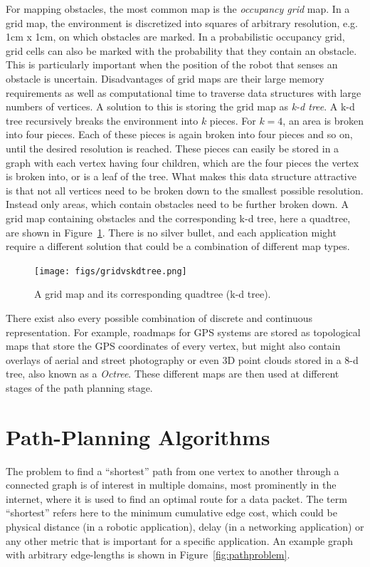 For mapping obstacles, the most common map is the \emph{occupancy grid} map. In a grid map, the environment is discretized into squares of arbitrary resolution, e.g. 1cm x 1cm, on which obstacles are marked. In a probabilistic occupancy grid, grid cells can also be marked with the probability that they contain an obstacle. This is particularly important when the position of the robot that senses an obstacle is uncertain. Disadvantages of grid maps are their large memory requirements as well as computational time to traverse data structures with large numbers of vertices. A solution to this is storing the grid map as \emph{k-d tree}. A k-d tree recursively breaks the environment into $k$ pieces. For $k=4$, an area is broken into four pieces. Each of these pieces is again broken into four pieces and so on, until the desired resolution is reached. These pieces can easily be stored in a graph with each vertex having four children, which are the four pieces the vertex is broken into, or is a leaf of the tree. What makes this data structure attractive is that not all vertices need to be broken down to the smallest possible resolution. Instead only areas, which contain obstacles need to be further broken down. A grid map containing obstacles and the corresponding k-d tree, here a quadtree, are shown in Figure~\ref{fig:gridvskdtree}. There is no silver bullet, and each application might require a different solution that could be a combination of different map types.

\begin{figure}
\centering
\texttt{[image: figs/gridvskdtree.png]}
\caption{A grid map and its corresponding quadtree (k-d tree).\label{fig:gridvskdtree}}
\end{figure}


There exist also every possible combination of discrete and continuous representation. For example, roadmaps for GPS systems are stored as topological maps that store the GPS coordinates of every vertex, but might also contain overlays of aerial and street photography or even 3D point clouds stored in a 8-d tree, also known as a \emph{Octree}. These different maps are then used at different stages of the path planning stage.


\section{Path-Planning Algorithms}
The problem to find a ``shortest'' path from one vertex to another through a connected graph is of interest in multiple domains, most prominently in the internet, where it is used to find an optimal route for a data packet. The term ``shortest'' refers here to the minimum cumulative edge cost, which could be physical distance (in a robotic application), delay (in a networking application) or any other metric that is important for a specific application. An example graph with arbitrary edge-lengths is shown in Figure~\ref{fig:pathproblem}.

